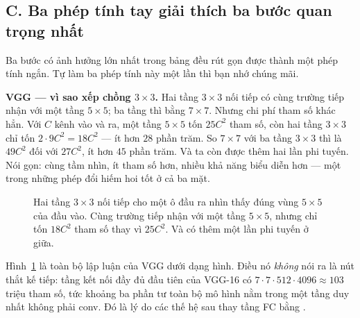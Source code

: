 \documentclass[../../../deep_learning.tex]{subfiles}
\begin{document}
\subsection{C. Ba phép tính tay giải thích ba bước quan trọng nhất}
Ba bước có ảnh hưởng lớn nhất trong bảng đều rút gọn được thành một phép tính ngắn. Tự làm ba phép tính này một lần thì bạn nhớ chúng mãi.

\textbf{VGG --- vì sao xếp chồng \(3\times3\).} Hai tầng \(3\times3\) nối tiếp có cùng trường tiếp nhận với một tầng \(5\times5\); ba tầng thì bằng \(7\times7\). Nhưng chi phí tham số khác hẳn. Với \(C\) kênh vào và ra, một tầng \(5\times5\) tốn \(25C^2\) tham số, còn hai tầng \(3\times3\) chỉ tốn \(2\cdot 9C^2 = 18C^2\) --- ít hơn \(28\) phần trăm. So \(7\times7\) với ba tầng \(3\times3\) thì là \(49C^2\) đối với \(27C^2\), ít hơn \(45\) phần trăm. Và ta còn được thêm hai lần phi tuyến. Nói gọn: cùng tầm nhìn, ít tham số hơn, nhiều khả năng biểu diễn hơn --- một trong những phép đổi hiếm hoi tốt ở cả ba mặt.

\begin{figure}[H]\centering
{}
\caption{Hai tầng \(3\times3\) nối tiếp cho một ô đầu ra nhìn thấy đúng vùng \(5\times5\) của đầu vào. Cùng trường tiếp nhận với một tầng \(5\times5\), nhưng chỉ tốn \(18C^2\) tham số thay vì \(25C^2\). Và có thêm một lần phi tuyến ở giữa.}
\label{fig:rf-3x3}
\end{figure}

Hình~\ref{fig:rf-3x3} là toàn bộ lập luận của VGG dưới dạng hình. Điều nó \emph{không} nói ra là nút thắt kế tiếp: tầng kết nối đầy đủ đầu tiên của VGG-16 có \(7\cdot 7\cdot 512\cdot 4096 \approx 103\) triệu tham số, tức khoảng ba phần tư toàn bộ mô hình nằm trong một tầng duy nhất không phải conv. Đó là lý do các thế hệ sau thay tầng FC bằng .
\end{document}
